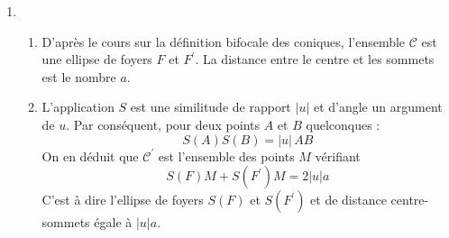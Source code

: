 \begin{enumerate}
 \item \begin{enumerate}
 \item D'après le cours sur la définition bifocale des coniques, l'ensemble $\mathcal C$ est une ellipse de foyers $F$ et $F^\prime$. La distance entre le centre et les sommets est le nombre $a$.
\item L'application $S$ est une similitude de rapport $|u|$ et d'angle un argument de $u$. Par conséquent, pour deux points $A$ et $B$ quelconques :
\begin{displaymath}
 S(A)S(B) = |u| \, AB
\end{displaymath}
On en déduit que $\mathcal C ^\prime$ est l'ensemble des points $M$ vérifiant
\begin{displaymath}
 S(F)M + S(F^\prime)M = 2|u|a
\end{displaymath}
C'est à dire l'ellipse de foyers $S(F)$ et $S(F^\prime)$ et de distance centre-sommets égale à $|u|a$.
\end{enumerate}


\end{enumerate}
